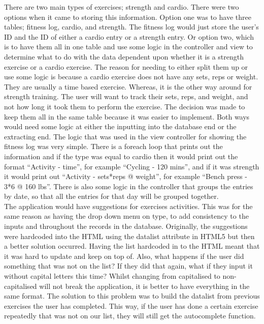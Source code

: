 There are two main types of exercises; strength and cardio. There were two options when it came to storing this information. Option one was to have three tables; fitness log, cardio, and strength. The fitness log would just store the user's ID and the ID of either a cardio entry or a strength entry. Or option two, which is to have them all in one table and use some logic in the controller and view to determine what to do with the data dependent upon whether it is a strength exercise or a cardio exercise. The reason for needing to either split them up or use some logic is because a cardio exercise does not have any sets, reps or weight. They are usually a time based exercise. Whereas, it is the other way around for strength training. The user will want to track their sets, reps, and weight, and not how long it took them to perform the exercise. The decision was made to keep them all in the same table because it was easier to implement. Both ways would need some logic at either the inputting into the database end or the extracting end. The logic that was used in the view controller for showing the fitness log was very simple. There is a foreach loop that prints out the information and if the type was equal to cardio then it would print out the format ``Activity - time'', for example ``Cycling - 120 mins'', and if it was strength it would print out ``Activity - sets*reps @ weight'', for example ``Bench press - 3*6 @ 160 lbs''. There is also some logic in the controller that groups the entries by date, so that all the entries for that day will be grouped together.\\

The application would have suggestions for exercises activities. This was for the same reason as having the drop down menu on type, to add consistency to the inputs and throughout the records in the database. Originally, the suggestions were hardcoded into the HTML using the datalist attribute in HTML5 but then a better solution occurred. Having the list hardcoded in to the HTML meant that it was hard to update and keep on top of. Also, what happens if the user did something that was not on the list? If they did that again, what if they input it without capital letters this time? Whilst changing from capitalised to non-capitalised will not break the application, it is better to have everything in the same format. The solution to this problem was to build the datalist from previous exercises the user has completed. This way, if the user has done a certain exercise repeatedly that was not on our list, they will still get the autocomplete function.\\

